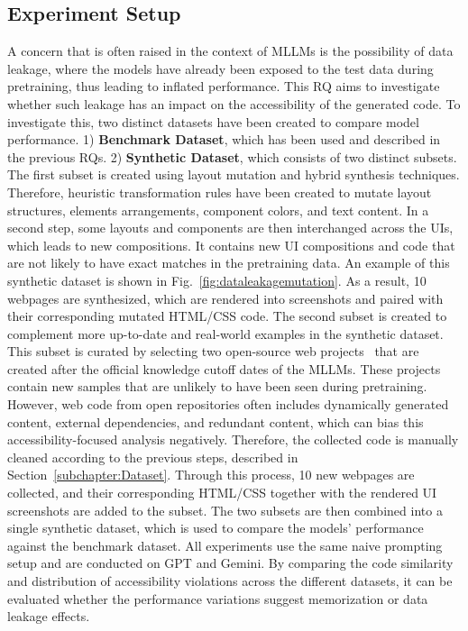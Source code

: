 \subsection{Experiment Setup}
A concern that is often raised in the context of MLLMs is 
the possibility of data leakage, where the models have 
already been exposed to the test data during pretraining, 
thus leading to inflated performance. This RQ aims to 
investigate whether such leakage has an impact on the 
accessibility of the generated code.\newline
To investigate this, two distinct datasets have been created 
to compare model performance. 1) \textbf{Benchmark Dataset},
which has been used and described in the previous RQs. 2)
\textbf{Synthetic Dataset}, which consists of two distinct 
subsets. The first subset is
created using layout mutation and
hybrid synthesis techniques. Therefore,
heuristic transformation rules have been created to
mutate layout structures, elements arrangements,
component colors, and text content. In a second step,
some layouts and components are then interchanged across 
the UIs, which leads to new compositions. 
It contains new
UI compositions and code that are not likely to have
exact matches in the pretraining data.
An example 
of this synthetic dataset is shown in Fig.~\ref{fig:dataleakagemutation}.
As a result, 10 webpages are synthesized, which are 
rendered into screenshots and paired with their 
corresponding mutated HTML/CSS code. 
The second subset is created to complement 
more up-to-date and real-world examples in the synthetic 
dataset. This subset is curated by selecting two 
open-source web projects~\cite{web:alphaonelabsedu, web:ecommerceferhan}
that are created after the official knowledge cutoff 
dates of the MLLMs. These projects contain new samples 
that are unlikely to have been seen during pretraining.
However, web code from open repositories often 
includes dynamically generated content, external dependencies, 
and redundant content, which can bias this accessibility-focused 
analysis negatively. Therefore, the collected code 
is manually cleaned according to the previous 
steps, described in Section~\ref{subchapter:Dataset}.
Through this process, 10 new webpages are collected, and
their corresponding HTML/CSS together with the rendered UI screenshots 
are added to the subset.\newline
The two subsets are then combined into a single 
synthetic dataset, which is used to compare the 
models' performance against the benchmark dataset.\newline
All experiments use the same naive prompting setup 
and are conducted on GPT and Gemini.
By comparing the code similarity and distribution of 
accessibility violations across the 
different datasets, it can be evaluated 
whether the performance variations suggest
memorization or data leakage effects.

